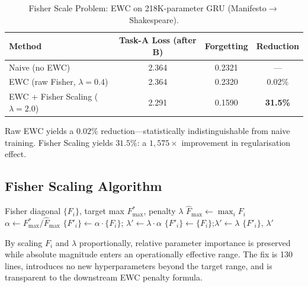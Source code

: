 \documentclass[12pt]{article}
\begin{document}
\begin{table}[ht]
\centering
\caption{Fisher Scale Problem: EWC on 218K-parameter GRU (Manifesto$\to$Shakespeare).}
\label{tab:fisher-scale}
\begin{tabular}{lccc}
\toprule
\textbf{Method} & \textbf{Task-A Loss (after B)} & \textbf{Forgetting} & \textbf{Reduction} \\
\midrule
Naive (no EWC)                            & 2.364 & 0.2321 & ---   \\
EWC (raw Fisher, $\lambda{=}0.4$)         & 2.364 & 0.2320 & 0.02\% \\
EWC + Fisher Scaling ($\lambda{=}2.0$)   & 2.291 & 0.1590 & \textbf{31.5\%} \\
\bottomrule
\end{tabular}
\end{table}

Raw EWC yields a $0.02\%$ reduction---statistically indistinguishable from
naive training. Fisher Scaling yields $31.5\%$: a $1{,}575\times$ improvement
in regularisation effect.

\subsection{Fisher Scaling Algorithm}

\begin{algorithm}[ht]
\caption{Fisher Scaling for EWC}
\label{alg:fisher-scaling}
\begin{algorithmic}[1]
\Require Fisher diagonal $\{F_i\}$, target max $F^*_{\max}$, penalty $\lambda$
\State $\hat{F}_{\max} \leftarrow \max_i F_i$
    \State $\alpha \leftarrow F^*_{\max} / \hat{F}_{\max}$
    \State $\{F'_i\} \leftarrow \alpha \cdot \{F_i\}$;\quad
           $\lambda' \leftarrow \lambda \cdot \alpha$
\Else
    \State $\{F'_i\} \leftarrow \{F_i\}$;\quad $\lambda' \leftarrow \lambda$
\EndIf
\State \Return $\{F'_i\},\, \lambda'$
\end{algorithmic}
\end{algorithm}

By scaling $F_i$ and $\lambda$ proportionally, relative parameter importance is
preserved while absolute magnitude enters an operationally effective range.
The fix is 130 lines, introduces no new hyperparameters beyond the target range,
and is transparent to the downstream EWC penalty formula.

\end{document}
